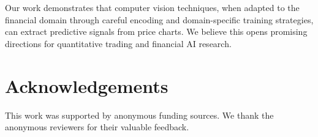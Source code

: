 \documentclass[runningheads]{llncs}
\begin{document}
Our work demonstrates that computer vision techniques, when adapted to the financial domain through careful encoding and domain-specific training strategies, can extract predictive signals from price charts. We believe this opens promising directions for quantitative trading and financial AI research.

\section*{Acknowledgements}
This work was supported by anonymous funding sources. We thank the anonymous reviewers for their valuable feedback.



\end{document}
